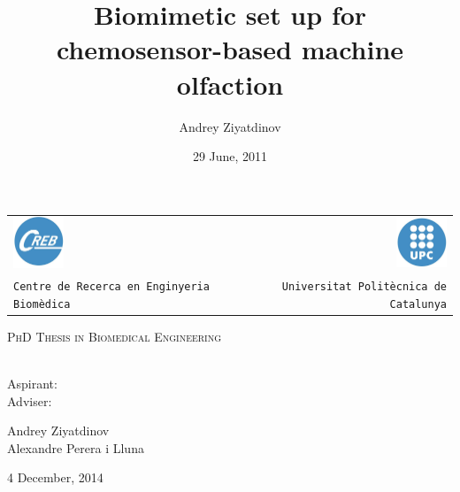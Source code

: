 \documentclass{beamer}              %
\title[\textnormal{ \hspace{30em} \insertframenumber/\inserttotalframenumber}]{Biomimetic set up for chemosensor-based machine olfaction}
\author[]{Andrey Ziyatdinov}
\date{29 June, 2011}
\renewcommand{\emph}[1]{{\color{MainBlue}{#1}}}
\begin{document}
\begin{frame}[plain]
  \begin{center}
    \begin{tabular}[\textwidth]{lp{1cm}r}
      \includegraphics[width=1.5cm]{logos/creb.jpg}
      &
      &
      \includegraphics[width=1.5cm]{logos/upc.jpg}\\
      \texttt{\tiny Centre de Recerca en Enginyeria Biomèdica}
      &
      &
      \texttt{\tiny Universitat Politècnica de Catalunya}
    \end{tabular}
  \end{center}

  \begin{center}
    \textsc{PhD Thesis in Biomedical Engineering}\\[0.1cm]
    {\Large \emph{Biomimetic set up for \\ chemosensor-based machine olfaction}}\\[1.6cm]
  
  \begin{center}
    \begin{minipage}{0.14\textwidth}
    \begin{flushleft} %
      Aspirant: \\
      Adviser: 
    \end{flushleft}
    \end{minipage}
    \begin{minipage}{0.6\textwidth}
    \begin{flushleft} %
      Andrey Ziyatdinov \\
      Alexandre Perera i Lluna
    \end{flushleft}
    \end{minipage}
  \end{center}  

    \vfill

    {4 December, 2014}
  \end{center}

\end{frame}
\end{document}

